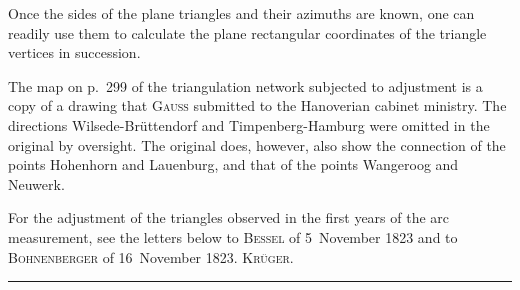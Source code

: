 \par\noindent\hspace*{\parindent}Once the sides of the plane triangles and their azimuths are known, one
can readily use them to calculate the plane rectangular coordinates of
the triangle vertices in succession.

\par\noindent\hspace*{\parindent}The map on p.~299 of the triangulation network subjected to adjustment is
a copy of a drawing that \textsc{Gauss} submitted to the Hanoverian cabinet
ministry. The directions Wilsede-Brüttendorf and Timpenberg-Hamburg were
omitted in the original by oversight. The original does, however, also show
the connection of the points Hohenhorn and Lauenburg, and that of the points
Wangeroog and Neuwerk.

\par\noindent\hspace*{\parindent}For the adjustment of the triangles observed in the first years of the
arc measurement, see the letters below to \textsc{Bessel} of 5~November 1823
and to \textsc{Bohnenberger} of 16~November 1823.
\hfill\textsc{Krüger.}

\begin{center}\rule{.24\textwidth}{.4pt}\end{center}
